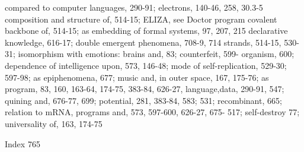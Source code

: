 compared to computer languages, 290-91;         electrons, 140-46, 258, 30.3-5
composition and structure of, 514-15;           ELIZA, see Doctor program
covalent backbone of, 514-15; as                embedding of formal systems, 97, 207, 215
declarative knowledge, 616-17; double           emergent phenomena, 708-9, 714
strands, 514-15, 530-31; isomorphism with       emotions: brains and, 83; counterfeit, 599-
organism,                                       600; dependence of intelligence upon, 573,
146-48; mode of self-replication, 529-30;       597-98; as epiphenomena, 677; music and,
in outer space, 167, 175-76; as program,        83, 160, 163-64, 174-75, 383-84, 626-27,
language,data, 290-91, 547; quining and,        676-77, 699; potential, 281, 383-84, 583;
531; recombinant, 665; relation to mRNA,        programs and, 573, 597-600, 626-27, 675-
517; self-destroy                               77; universality of, 163, 174-75



Index                                                                                  765

